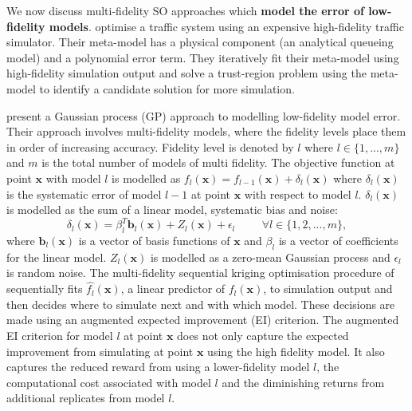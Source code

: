 \documentclass[12pt,a4paper]{article}
\begin{document}
We now discuss multi-fidelity SO approaches which \textbf{model the error of low-fidelity models}. \cite{chong2018simulation} optimise a traffic system using an expensive high-fidelity traffic simulator. Their meta-model has a physical component (an analytical queueing model) and a polynomial error term. They iteratively fit their meta-model using high-fidelity simulation output and solve a trust-region problem using the meta-model to identify a candidate solution for more simulation.

\cite{huang2006sequential} present a Gaussian process (GP) approach to modelling low-fidelity model error. Their approach involves multi-fidelity models, where the fidelity levels place them in order of increasing accuracy. Fidelity level is denoted by $l$ where $l\in\{1, ..., m\}$ and $m$ is the total number of models of multi fidelity. The objective function at point $\boldsymbol{x}$ with model $l$ is modelled as $f_l(\boldsymbol{x}) = f_{l-1}(\boldsymbol{x}) + \delta_l(\boldsymbol{x})$ where $\delta_l(\boldsymbol{x})$ is the systematic error of model $l-1$ at point $\boldsymbol{x}$ with respect to model $l$. $\delta_l(\boldsymbol{x})$ is modelled as the sum of a linear model, systematic bias and noise:
%
\begin{equation}
  \delta_l(\boldsymbol{x}) = \beta_l^{T}\boldsymbol{b}_l(\boldsymbol{x}) + Z_l(\boldsymbol{x}) + \epsilon_l \hspace{1cm} \forall l \in \{1, 2, . . . ,m\},
\end{equation}
%
where $\boldsymbol{b}_l(\boldsymbol{x})$ is a vector of basis functions of $\boldsymbol{x}$ and $\beta_l$ is a vector of coefficients for the linear model. $Z_l(\boldsymbol{x})$ is modelled as a zero-mean Gaussian process and $\epsilon_l$ is random noise. The  multi-fidelity sequential kriging optimisation procedure of \cite{huang2006sequential} sequentially fits $\hat{f_l}(\boldsymbol{x})$, a linear predictor of $f_l(\boldsymbol{x})$, to simulation output and then decides where to simulate next and with which model. These decisions are made using an augmented expected improvement (EI) criterion. The augmented EI criterion for model $l$ at point $\boldsymbol{x}$ does not only capture the expected improvement from simulating at point $\boldsymbol{x}$ using the high fidelity model. It also captures the reduced reward from using a lower-fidelity model $l$, the computational cost associated with model $l$ and the diminishing returns from additional replicates from model $l$.
\end{document}
